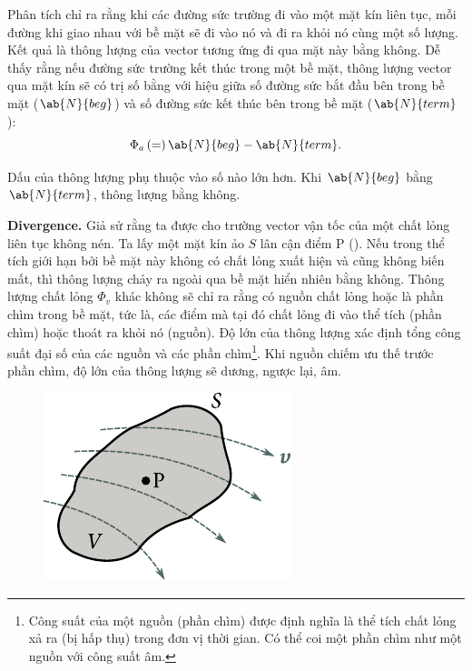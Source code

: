 Phân tích  chỉ ra rằng khi các đường sức trường đi vào một mặt kín liên tục, mỗi đường khi giao nhau với bề mặt sẽ đi vào nó và đi ra khỏi nó cùng một số lượng. Kết quả là thông lượng của vector tương ứng đi qua mặt này bằng không. Dễ thấy rằng nếu đường sức trường kết thúc trong một bề mặt, thông lượng vector qua mặt kín sẽ có trị số bằng với hiệu giữa số đường sức bắt đầu bên trong bề mặt ($\ab{N}{beg}$) và số đường sức kết thúc bên trong bề mặt ($\ab{N}{term}$):
\begin{equation}\label{eq:1_77}
	\Phi_a\, (=)\, \ab{N}{beg} - \ab{N}{term}.
\end{equation}

\noindent
Dấu của thông lượng phụ thuộc vào số nào lớn hơn. Khi $\ab{N}{beg}$ bằng $\ab{N}{term}$, thông lượng bằng không.

\textbf{Divergence.} Giả sử rằng ta được cho trường vector vận tốc của một chất lỏng liên tục không nén. Ta lấy một mặt kín ảo $S$ lân cận điểm P (). Nếu trong thể tích giới hạn bởi bề mặt này không có chất lỏng xuất hiện và cũng không biến mất, thì thông lượng chảy ra ngoài qua bề mặt hiển nhiên bằng không. Thông lượng chất lỏng $\Phi_v$ khác không sẽ chỉ ra rằng có nguồn chất lỏng hoặc là phần chìm trong bề mặt, tức là, các điểm mà tại đó chất lỏng đi vào thể tích (phần chìm) hoặc thoát ra khỏi nó (nguồn). Độ lớn của thông lượng xác định tổng công suất đại số của các nguồn và các phần chìm\footnote{Công suất của một nguồn (phần chìm) được định nghĩa là thể tích chất lỏng xả ra (bị hấp thụ) trong đơn vị thời gian. Có thể coi một phần chìm như một nguồn với công suất âm.}. Khi nguồn chiếm ưu thế trước phần chìm, độ lớn của thông lượng sẽ dương, ngược lại, âm.

\begin{figure}[!htb]
	\begin{center}
		\includegraphics[scale=1]{figures/ch_01/fig_1_23.pdf}
		\caption[]{}
		\label{fig:1_23}
	\end{center}
	\vspace{-0.8cm}
\end{figure}

